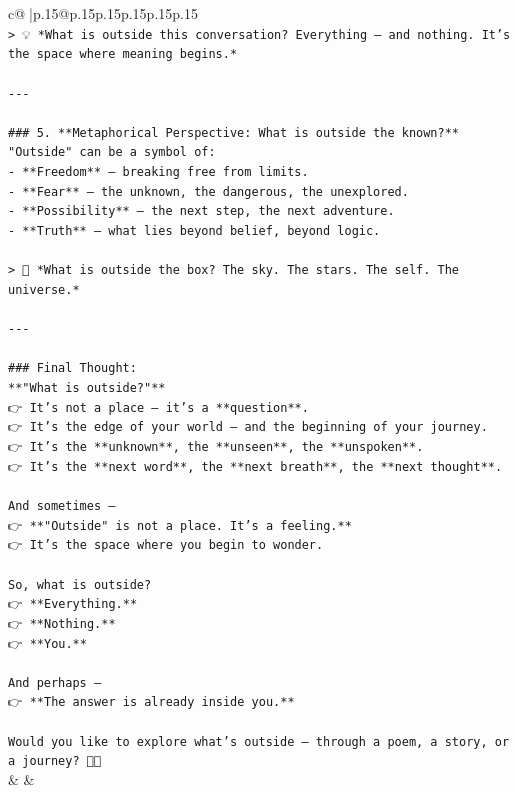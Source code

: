 \documentclass{article}
\begin{document}
{\begin{supertabular}{c@{$\;$}|p{.15\linewidth}@{}p{.15\linewidth}p{.15\linewidth}p{.15\linewidth}p{.15\linewidth}p{.15\linewidth}}
{{{\\ 
\texttt{> 💡 *What is outside this conversation? Everything — and nothing. It’s the space where meaning begins.*} \\
\\ 
\texttt{{-}{-}{-}} \\
\\ 
\texttt{\#\#\# 5. **Metaphorical Perspective: What is outside the known?**} \\
\texttt{"Outside" can be a symbol of:} \\
\texttt{{-} **Freedom** — breaking free from limits.} \\
\texttt{{-} **Fear** — the unknown, the dangerous, the unexplored.} \\
\texttt{{-} **Possibility** — the next step, the next adventure.} \\
\texttt{{-} **Truth** — what lies beyond belief, beyond logic.} \\
\\ 
\texttt{> 🌿 *What is outside the box? The sky. The stars. The self. The universe.*} \\
\\ 
\texttt{{-}{-}{-}} \\
\\ 
\texttt{\#\#\# Final Thought:  } \\
\texttt{**"What is outside?"**  } \\
\texttt{👉 It’s not a place — it’s a **question**.  } \\
\texttt{👉 It’s the edge of your world — and the beginning of your journey.  } \\
\texttt{👉 It’s the **unknown**, the **unseen**, the **unspoken**.  } \\
\texttt{👉 It’s the **next word**, the **next breath**, the **next thought**.} \\
\\ 
\texttt{And sometimes —  } \\
\texttt{👉 **"Outside" is not a place. It’s a feeling.**  } \\
\texttt{👉 It’s the space where you begin to wonder.} \\
\\ 
\texttt{So, what is outside?  } \\
\texttt{👉 **Everything.**  } \\
\texttt{👉 **Nothing.**  } \\
\texttt{👉 **You.**} \\
\\ 
\texttt{And perhaps —  } \\
\texttt{👉 **The answer is already inside you.**} \\
\\ 
\texttt{Would you like to explore what’s outside — through a poem, a story, or a journey? 🌌✨} \\
            }
        }
    }
    & & \\ \\


\end{supertabular}}
\end{document}
